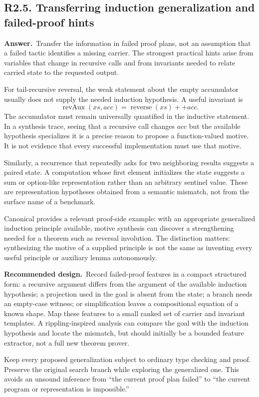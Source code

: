 \documentclass[11pt,a4paper]{article}
\newcommand{\qid}[3]{\subsection{#2. #3}\label{#1}}
\newcommand{\answer}{\noindent\textbf{Answer.}\ }
\newcommand{\proposal}{\noindent\textbf{Recommended design.}\ }
\theoremstyle{remark}
\begin{document}
\qid{q25}{R2.5}{Transferring induction generalization and failed-proof hints}
\answer Transfer the information in failed proof plans, not an assumption that a failed tactic identifies a missing carrier. The strongest practical hints arise from variables that change in recursive calls and from invariants needed to relate carried state to the requested output.

For tail-recursive reversal, the weak statement about the empty accumulator usually does not supply the needed induction hypothesis. A useful invariant is
\[
 \operatorname{revAux}(xs,acc)=\operatorname{reverse}(xs)++acc.
\]
The accumulator must remain universally quantified in the inductive statement. In a synthesis trace, seeing that a recursive call changes $acc$ but the available hypothesis specializes it is a precise reason to propose a function-valued motive. It is not evidence that every successful implementation must use that motive.

Similarly, a recurrence that repeatedly asks for two neighboring results suggests a paired state. A computation whose first element initializes the state suggests a sum or option-like representation rather than an arbitrary sentinel value. These are representation hypotheses obtained from a semantic mismatch, not from the surface name of a benchmark.

Canonical provides a relevant proof-side example: with an appropriate generalized induction principle available, motive synthesis can discover a strengthening needed for a theorem such as reversal involution. The distinction matters: synthesizing the motive of a supplied principle is not the same as inventing every useful principle or auxiliary lemma autonomously.~\cite{canonical}

\proposal Record failed-proof features in a compact structured form: a recursive argument differs from the argument of the available induction hypothesis; a projection used in the goal is absent from the state; a branch needs an empty-case witness; or simplification leaves a compositional equation of a known shape. Map these features to a small ranked set of carrier and invariant templates. A rippling-inspired analysis can compare the goal with the induction hypothesis and locate the mismatch, but should initially be a bounded feature extractor, not a full new theorem prover.

Keep every proposed generalization subject to ordinary type checking and proof. Preserve the original search branch while exploring the generalized one. This avoids an unsound inference from ``the current proof plan failed'' to ``the current program or representation is impossible.''
\end{document}
